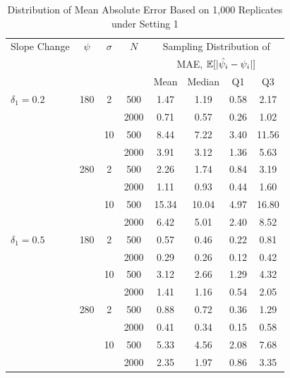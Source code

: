 \documentclass [12pt, proquest] {uwthesis}[2016/11/22]
\begin{document}
\begin{table}
\centering
\renewcommand\arraystretch{0.75}
\begin{tabular}{@{} lccccccc @{}} 
\toprule
    {Slope Change} & {$\psi$} & $\sigma$ & $N$ & \multicolumn{4}{c}{Sampling Distribution of} \\
    & & & & \multicolumn{4}{c}{MAE, $\mathbb{E}[\lvert \Hat{\psi_i} - \psi_i \rvert]$} \\
    \cmidrule(lr){5-8}
     & & & & Mean & Median & Q1 & Q3 \\
\midrule
    $\delta_1 = 0.2$ & 180 & 2 & 500 & 1.47 & 1.19 & 0.58 & 2.17 \\
                     &     &   & 2000 & 0.71 & 0.57 & 0.26 & 1.02  \\
                     &     & 10 & 500 & 8.44 & 7.22 & 3.40 & 11.56 \\
                     &     &    & 2000 & 3.91 & 3.12 & 1.36 & 5.63 \\
                     & 280 & 2 & 500 & 2.26 & 1.74 & 0.84 & 3.19 \\
                     &     &   & 2000 & 1.11 & 0.93 & 0.44 & 1.60 \\
                     &     & 10 & 500 & 15.34 & 10.04 & 4.97 & 16.80 \\
                     &     &    & 2000 & 6.42 & 5.01 & 2.40 & 8.52 \\
\midrule
    $\delta_1 = 0.5$ & 180 & 2 & 500 & 0.57 & 0.46 & 0.22 & 0.81  \\
                     &     &   & 2000 & 0.29 & 0.26 & 0.12 & 0.42 \\
                     &     & 10 & 500 & 3.12 & 2.66 & 1.29 & 4.32 \\
                     &     &     & 2000 & 1.41 & 1.16 & 0.54 & 2.05 \\
                     & 280 & 2 & 500 & 0.88 & 0.72 & 0.36 & 1.29 \\
                     &     &     & 2000 & 0.41 & 0.34 & 0.15 & 0.58 \\
                     &     & 10 & 500 & 5.33 & 4.56 & 2.08 & 7.68 \\
                     &     &     & 2000 & 2.35 & 1.97 & 0.86 & 3.35 \\    
\bottomrule
\end{tabular}
\caption{Distribution of Mean Absolute Error Based on 1,000 Replicates under Setting 1}
\end{table}
\end{document}
